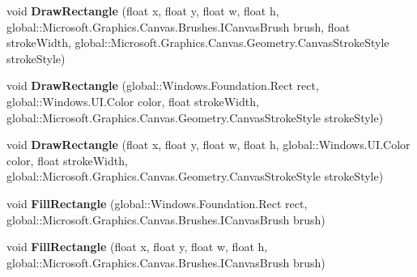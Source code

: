 \begin{DoxyCompactItemize}
\item 
\mbox{\label{class_microsoft_1_1_graphics_1_1_canvas_1_1_canvas_drawing_session_af4a31d2b87f5a4e8de01db53ff030ac7}} 
void {\bfseries Draw\+Rectangle} (float x, float y, float w, float h, global\+::\+Microsoft.\+Graphics.\+Canvas.\+Brushes.\+I\+Canvas\+Brush brush, float stroke\+Width, global\+::\+Microsoft.\+Graphics.\+Canvas.\+Geometry.\+Canvas\+Stroke\+Style stroke\+Style)
\item 
\mbox{\label{class_microsoft_1_1_graphics_1_1_canvas_1_1_canvas_drawing_session_a1df54d826ccf73b48a197a79d4dab761}} 
void {\bfseries Draw\+Rectangle} (global\+::\+Windows.\+Foundation.\+Rect rect, global\+::\+Windows.\+U\+I.\+Color color, float stroke\+Width, global\+::\+Microsoft.\+Graphics.\+Canvas.\+Geometry.\+Canvas\+Stroke\+Style stroke\+Style)
\item 
\mbox{\label{class_microsoft_1_1_graphics_1_1_canvas_1_1_canvas_drawing_session_af488d343e41a8735d50be1cb53d69238}} 
void {\bfseries Draw\+Rectangle} (float x, float y, float w, float h, global\+::\+Windows.\+U\+I.\+Color color, float stroke\+Width, global\+::\+Microsoft.\+Graphics.\+Canvas.\+Geometry.\+Canvas\+Stroke\+Style stroke\+Style)
\item 
\mbox{\label{class_microsoft_1_1_graphics_1_1_canvas_1_1_canvas_drawing_session_a8dca87e0a5de1ba6f45dc2591daf896f}} 
void {\bfseries Fill\+Rectangle} (global\+::\+Windows.\+Foundation.\+Rect rect, global\+::\+Microsoft.\+Graphics.\+Canvas.\+Brushes.\+I\+Canvas\+Brush brush)
\item 
\mbox{\label{class_microsoft_1_1_graphics_1_1_canvas_1_1_canvas_drawing_session_a2d0a5ff2de308cd43792b947c3f95b2d}} 
void {\bfseries Fill\+Rectangle} (float x, float y, float w, float h, global\+::\+Microsoft.\+Graphics.\+Canvas.\+Brushes.\+I\+Canvas\+Brush brush)
\item 
\mbox{\label{class_microsoft_1_1_graphics_1_1_canvas_1_1_canvas_drawing_session_af69ae76829c99b0bfa2437398448fd5c}} 

\end{DoxyCompactItemize}
